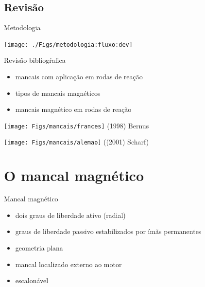 \documentclass{beamer}
\begin{document}
\subsection{Revisão}



\begin{frame}{Metodologia}
	\begin{center}
	\texttt{[image: ./Figs/metodologia:fluxo:dev]}
	\end{center}
\end{frame}
%

\begin{frame}{Revisão bibliogŕafica}
	\begin{itemize}
		\item mancais com aplicação em rodas de reação
		\item tipos de mancais magnéticos
		\item mancais magnético em rodas de reação
	\end{itemize}
	
	\begin{center}
	\texttt{[image: Figs/mancais/frances]}
	\tiny{(1998) Bernus}
	\end{center}
	
	\begin{center}
	\texttt{[image: Figs/mancais/alemao]}
	\tiny((2001) Scharf)
	\end{center}
	
\end{frame}


\section{O mancal magnético}

\begin{frame}{Mancal magnético}

	\begin{itemize}
		\item dois graus de liberdade ativo (radial)
		\item graus de liberdade passivo estabilizados por ímãs permanentes
		\item geometria plana
		\item mancal localizado externo ao motor
		\item escalonável 
	\end{itemize}	
%
\end{frame}
\end{document}
